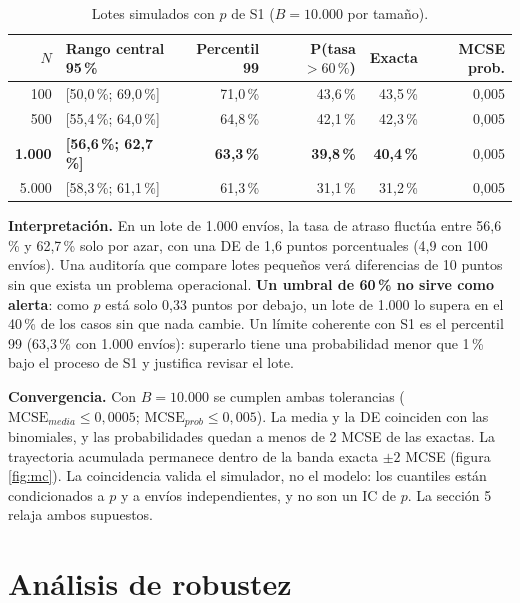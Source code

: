 \documentclass[11pt,a4paper]{article}
\begin{document}
\begin{table}[H]\centering\footnotesize\setlength{\tabcolsep}{5pt}
\caption{Lotes simulados con $p$ de S1 ($B = 10.000$ por tamaño).}\label{tab:mc}
\begin{tabular}{@{}r l r r r r@{}}\toprule
$N$ & Rango central 95\,\% & Percentil 99 & P(tasa $> 60\,\%$) & Exacta & MCSE prob.\\\midrule
100 & [50,0\,\%; 69,0\,\%] & 71,0\,\% & 43,6\,\% & 43,5\,\% & 0,005\\
500 & [55,4\,\%; 64,0\,\%] & 64,8\,\% & 42,1\,\% & 42,3\,\% & 0,005\\
\textbf{1.000} & \textbf{[56,6\,\%; 62,7\,\%]} & \textbf{63,3\,\%} & \textbf{39,8\,\%} & \textbf{40,4\,\%} & 0,005\\
5.000 & [58,3\,\%; 61,1\,\%] & 61,3\,\% & 31,1\,\% & 31,2\,\% & 0,005\\\bottomrule
\end{tabular}\end{table}

\textbf{Interpretación.} En un lote de 1.000 envíos, la tasa de atraso fluctúa entre 56,6\,\% y 62,7\,\% solo por azar, con una DE de 1,6 puntos porcentuales (4,9 con 100 envíos). Una auditoría que compare lotes pequeños verá diferencias de 10 puntos sin que exista un problema operacional. \textbf{Un umbral de 60\,\% no sirve como alerta}: como $p$ está solo 0,33 puntos por debajo, un lote de 1.000 lo supera en el 40\,\% de los casos sin que nada cambie. Un límite coherente con S1 es el percentil 99 (63,3\,\% con 1.000 envíos): superarlo tiene una probabilidad menor que 1\,\% bajo el proceso de S1 y justifica revisar el lote.

\textbf{Convergencia.} Con $B = 10.000$ se cumplen ambas tolerancias ($\mathrm{MCSE}_{media} \le 0{,}0005$; $\mathrm{MCSE}_{prob} \le 0{,}005$). La media y la DE coinciden con las binomiales, y las probabilidades quedan a menos de 2 MCSE de las exactas. La trayectoria acumulada permanece dentro de la banda exacta $\pm 2$ MCSE (figura \ref{fig:mc}). La coincidencia valida el simulador, no el modelo: los cuantiles están condicionados a $p$ y a envíos independientes, y no son un IC de $p$. La sección 5 relaja ambos supuestos.

\section{Análisis de robustez}
\end{document}
